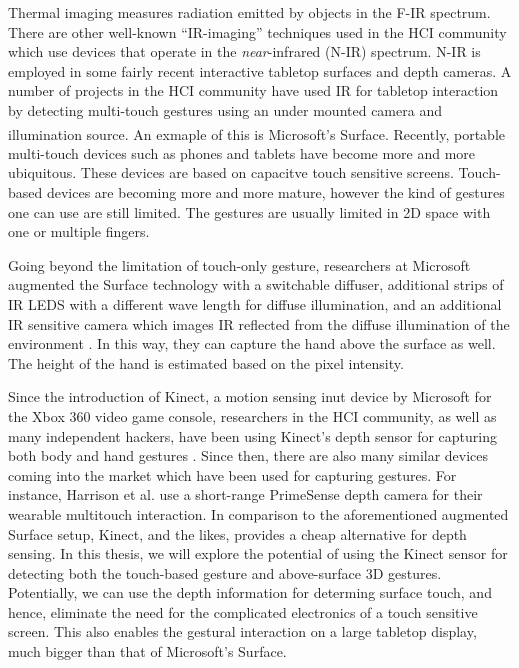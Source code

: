 Thermal imaging measures radiation emitted by objects in the F-IR spectrum.
There are other well-known ``IR-imaging'' techniques used in the HCI community
which use devices that operate in the \textit{near}-infrared (N-IR) spectrum.
N-IR is employed in some fairly recent interactive tabletop surfaces and depth
cameras. A number of projects in the HCI community have used IR for tabletop
interaction by detecting multi-touch gestures using an under mounted
camera and illumination source. An exmaple of this is Microsoft's 
Surface\textsuperscript{\textregistered}. Recently, portable multi-touch devices
such as phones and tablets have become more and more ubiquitous. These devices
are based on capacitve touch sensitive screens. Touch-based devices are becoming
more and more mature, however the kind of gestures one can use are still
limited. The gestures are usually limited in 2D space with one or multiple
fingers. 

Going beyond the limitation of touch-only gesture, researchers at Microsoft
augmented the Surface technology with a switchable diffuser, additional
strips of IR LEDS with a different wave length for diffuse illumination, and an
additional IR sensitive camera which images IR reflected from the diffuse
illumination of the environment \cite{hilliges09}. In this way, they can capture
the hand above the surface as well. The height of the hand is estimated based on
the pixel intensity.

Since the introduction of Kinect, a motion sensing inut device by Microsoft for
the Xbox 360 video game console, researchers in the HCI community, as well as
many independent hackers, have been using Kinect's depth sensor for capturing
both body and hand gestures \cite{openni}. Since then, there are also many
similar devices coming into the market which have been used for capturing
gestures. For instance, Harrison et al. \cite{harrison11} use  a short-range
PrimeSense \cite{primesense} depth camera for their wearable multitouch
interaction. In comparison to the aforementioned augmented Surface setup,
Kinect, and the likes, provides a cheap alternative for depth sensing. In this
thesis, we will explore the potential of using the Kinect sensor for detecting 
both the touch-based gesture and above-surface 3D gestures. Potentially, we can 
use the depth information for determing surface touch, and hence, eliminate the 
need for the complicated electronics of a touch sensitive screen. This also 
enables the gestural interaction on a large tabletop display, much bigger than 
that of Microsoft's Surface.

